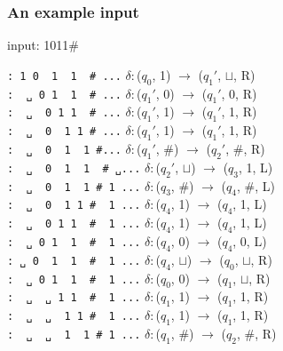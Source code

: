 \hypertarget{an-example-input}{%
\subsubsection{An example input}\label{an-example-input}}

input: 1011\#

\texttt{:\ \textbar{}1\textbar{}\ 0\ \ 1\ \ 1\ \ \#\ ...}
\(\delta:\)(\(q_0\), 1) \(\to\) (\(q_1'\), \(\sqcup\), R)\\
\texttt{:\ \ ␣\ \textbar{}0\textbar{}\ 1\ \ 1\ \ \#\ ...}
\(\delta:\)(\(q_1'\), 0) \(\to\) (\(q_1'\), 0, R)\\
\texttt{:\ \ ␣\ \ 0\ \textbar{}1\textbar{}\ 1\ \ \#\ ...}
\(\delta:\)(\(q_1'\), 1) \(\to\) (\(q_1'\), 1, R)\\
\texttt{:\ \ ␣\ \ 0\ \ 1\ \textbar{}1\textbar{}\ \#\ ...}
\(\delta:\)(\(q_1'\), 1) \(\to\) (\(q_1'\), 1, R)\\
\texttt{:\ \ ␣\ \ 0\ \ 1\ \ 1\ \textbar{}\#\textbar{}...}
\(\delta:\)(\(q_1'\), \#) \(\to\) (\(q_2'\), \#, R)\\
\texttt{:\ \ ␣\ \ 0\ \ 1\ \ 1\ \ \#\ \textbar{}␣\textbar{}...}
\(\delta:\)(\(q_2'\), \(\sqcup\)) \(\to\) (\(q_3\), 1, L)\\
\texttt{:\ \ ␣\ \ 0\ \ 1\ \ 1\ \textbar{}\#\textbar{}\ 1\ ...}
\(\delta:\)(\(q_3\), \#) \(\to\) (\(q_4\), \#, L)\\
\texttt{:\ \ ␣\ \ 0\ \ 1\ \textbar{}1\textbar{}\ \#\ \ 1\ ...}
\(\delta:\)(\(q_4\), 1) \(\to\) (\(q_4\), 1, L)\\
\texttt{:\ \ ␣\ \ 0\ \textbar{}1\textbar{}\ 1\ \ \#\ \ 1\ ...}
\(\delta:\)(\(q_4\), 1) \(\to\) (\(q_4\), 1, L)\\
\texttt{:\ \ ␣\ \textbar{}0\textbar{}\ 1\ \ 1\ \ \#\ \ 1\ ...}
\(\delta:\)(\(q_4\), 0) \(\to\) (\(q_4\), 0, L)\\
\texttt{:\ \textbar{}␣\textbar{}\ 0\ \ 1\ \ 1\ \ \#\ \ 1\ ...}
\(\delta:\)(\(q_4\), \(\sqcup\)) \(\to\) (\(q_0\), \(\sqcup\), R)\\
\texttt{:\ \ ␣\ \textbar{}0\textbar{}\ 1\ \ 1\ \ \#\ \ 1\ ...}
\(\delta:\)(\(q_0\), 0) \(\to\) (\(q_1\), \(\sqcup\), R)\\
\texttt{:\ \ ␣\ \ ␣\ \textbar{}1\textbar{}\ 1\ \ \#\ \ 1\ ...}
\(\delta:\)(\(q_1\), 1) \(\to\) (\(q_1\), 1, R)\\
\texttt{:\ \ ␣\ \ ␣\ \ 1\ \textbar{}1\textbar{}\ \#\ \ 1\ ...}
\(\delta:\)(\(q_1\), 1) \(\to\) (\(q_1\), 1, R)\\
\texttt{:\ \ ␣\ \ ␣\ \ 1\ \ 1\ \textbar{}\#\textbar{}\ 1\ ...}
\(\delta:\)(\(q_1\), \#) \(\to\) (\(q_2\), \#, R)\\
